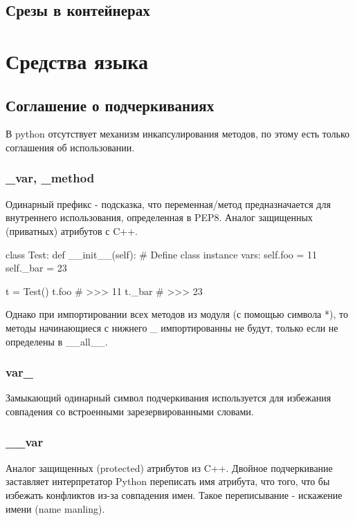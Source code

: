 \subsection{Срезы в контейнерах}

\section{Средства языка}

\subsection{Соглашение о подчеркиваниях}

В python отсутствует механизм инкапсулирования методов, по этому есть только соглашения об использовании.

\subsubsection{\_var, \_method}

Одинарный префикс - подсказка, что переменная/метод предназначается для внутреннего использования, определенная в PEP8. Аналог защищенных (приватных) атрибутов с C++.

\begin{python}
class Test:
    def __init__(self):
        # Define class instance vars:
        self.foo = 11
        self._bar = 23

t = Test()
t.foo
# >>> 11
t._bar
# >>> 23
\end{python}

Однако при импортировании всех методов из модуля (с помощью символа *), то методы начинающиеся с нижнего \_ импортированны не будут, только если не определены в \_\_all\_\_.

\subsubsection{var\_}

Замыкающий одинарный символ подчеркивания используется для избежания совпадения со встроенными зарезервированными словами.

\subsubsection{\_\_var}

Аналог защищенных (protected) атрибутов из C++. Двойное подчеркивание заставляет интерпретатор Python переписать имя атрибута, что того, что бы избежать конфликтов из-за совпадения имен. Такое переписывание - искажение имени (name manling).

